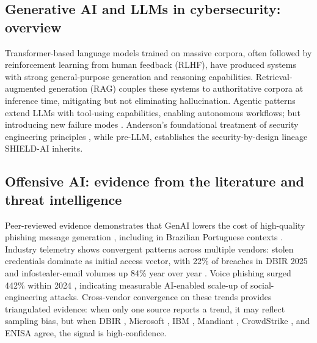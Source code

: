 \documentclass[preprint,12pt,authoryear]{elsarticle}
\begin{document}
\subsection{Generative AI and LLMs in cybersecurity: overview}
Transformer-based language models trained on massive corpora, often followed by reinforcement learning from human feedback (RLHF), have produced systems with strong general-purpose generation and reasoning capabilities. Retrieval-augmented generation (RAG) couples these systems to authoritative corpora at inference time, mitigating but not eliminating hallucination. Agentic patterns extend LLMs with tool-using capabilities, enabling autonomous workflows; but introducing new failure modes \citep{owasp2025agentic}. Anderson's foundational treatment of security engineering principles \citep{anderson2020security}, while pre-LLM, establishes the security-by-design lineage SHIELD-AI inherits.

\subsection{Offensive AI: evidence from the literature and threat intelligence}
\label{ssec:offensive}
Peer-reviewed evidence demonstrates that GenAI lowers the cost of high-quality phishing message generation \citep{hazell2023spear}, including in Brazilian Portuguese contexts \citep{sbseg2024phishing}. Industry telemetry shows convergent patterns across multiple vendors: stolen credentials dominate as initial access vector, with 22\% of breaches in DBIR 2025 \citep{dbir2025} and infostealer-email volumes up 84\% year over year \citep{xforce2025}. Voice phishing surged 442\% within 2024 \citep{crowdstrike2025}, indicating measurable AI-enabled scale-up of social-engineering attacks. Cross-vendor convergence on these trends provides triangulated evidence: when only one source reports a trend, it may reflect sampling bias, but when DBIR \citep{dbir2024,dbir2025}, Microsoft \citep{mddr2024,mddr2025}, IBM \citep{xforce2024,xforce2025}, Mandiant \citep{mtrends2024,mtrends2025}, CrowdStrike \citep{crowdstrike2024,crowdstrike2025}, and ENISA \citep{enisa2024,enisa2025} agree, the signal is high-confidence.
\end{document}
